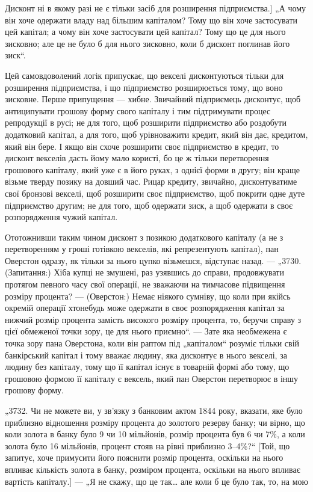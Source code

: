 \parcont{}  %
Дисконт ні в якому разі не є тільки засіб для розширення підприємства.] „А чому він хоче одержати
владу над більшим капіталом? Тому що він хоче застосувати цей капітал; а чому він
хоче застосувати цей капітал? Тому що це для нього зисковно;
але це не було б для нього зисковно, коли б дисконт поглинав
його зиск“.

Цей самовдоволений логік припускає, що векселі дисконтуються тільки для розширення підприємства, і
що підприємство
розширюється тому, що воно зисковне. Перше припущення — хибне. Звичайний підприємець дисконтує, щоб
антиципувати грошову форму свого капіталу і тим підтримувати процес репродукції в русі; не для того,
щоб розширити підприємство або роздобути додатковий капітал, а для того, щоб урівноважити кредит,
який він дає, кредитом, який він бере. І якщо він схоче
розширити своє підприємство в кредит, то дисконт векселів
дасть йому мало користі, бо це ж тільки перетворення грошового капіталу, який уже є в його руках, з
однієї форми
в другу; він краще візьме тверду позику на довший час.
Рицар кредиту, звичайно, дисконтуватиме свої бронзові векселі,
щоб розширити своє підприємство, щоб покрити одне дуте підприємство другим; не для того, щоб
одержати зиск, а щоб одержати в своє розпорядження чужий капітал.

Ототожнивши таким чином дисконт з позикою додаткового
капіталу (а не з перетворенням у гроші готівкою векселів, які
репрезентують капітал), пан Оверстон одразу, як тільки за нього
цупко візьмешся, відступає назад. — „3730. (Запитання:) Хіба
купці не змушені, раз узявшись до справи, продовжувати протягом певного часу свої операції, не
зважаючи на тимчасове
підвищення розміру процента? — (Оверстон:) Немає ніякого
сумніву, що коли при якійсь окремій операції хтонебудь може
одержати в своє розпорядження капітал за нижчий розмір
процента замість високого розміру процента, то, беручи справу
з цієї обмеженої точки зору, це для нього приємно“. — Зате
яка необмежена є точка зору пана Оверстона, коли він раптом
під „капіталом“ розуміє тільки свій банкірський капітал і тому
вважає людину, яка дисконтує в нього векселі, за людину без
капіталу, тому що її капітал існує в товарній формі або тому,
що грошовою формою її капіталу є вексель, який пан Оверстон
перетворює в іншу грошову форму.

„3732. Чи не можете ви, у зв’язку з банковим актом 1844 року,
вказати, яке було приблизно відношення розміру процента до
золотого резерву банку; чи вірно, що коли золота в банку було
9 чи 10 мільйонів, розмір процента був 6 чи 7\%, а коли золота
було 16 мільйонів, процент стояв на рівні приблизно 3--4\%?“
[Той, що запитує, хоче примусити його пояснити розмір процента, оскільки на нього впливає кількість
золота в банку, розміром процента, оскільки на нього впливає вартість капіталу.] —
„Я не скажу, що це так\dots{} але коли б це було так, то, на мою
\parbreak{}  %
